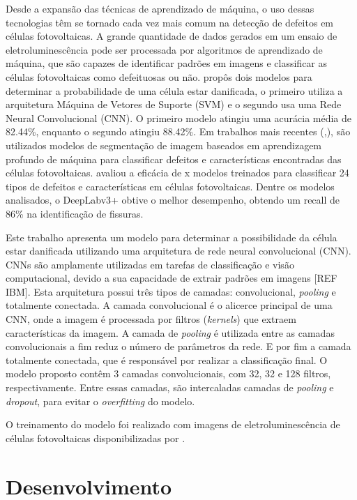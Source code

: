 \documentclass[conference]{IEEEtran}
\begin{document}
Desde a expansão das técnicas de aprendizado de máquina, o uso dessas
tecnologias têm se tornado cada vez mais comum na detecção de defeitos em
células fotovoltaicas. A grande quantidade de dados gerados em um ensaio de
eletroluminescência pode ser processada por algoritmos de aprendizado de
máquina, que são capazes de identificar padrões em imagens e classificar as
células fotovoltaicas como defeituosas ou não. \cite{Pratt2023} propôs
dois modelos
para determinar a probabilidade de uma célula estar danificada, o primeiro
utiliza a arquitetura
Máquina de Vetores de Suporte (SVM) e o segundo usa uma Rede Neural
Convolucional (CNN). O primeiro modelo atingiu uma acurácia média de 82.44\%,
enquanto o segundo atingiu 88.42\%. Em trabalhos mais recentes
(\cite{Pratt2023},\cite{Pratt2021}), são
utilizados modelos de segmentação de imagem baseados em aprendizagem profundo
de máquina para classificar defeitos e características encontradas das células
fotovoltaicas.\cite{Pratt2023} avaliou a eficácia de x modelos treinados para
classificar
24 tipos de defeitos e características em células fotovoltaicas.
Dentre os modelos analisados, o DeepLabv3+ obtive o melhor
desempenho, obtendo um recall de 86\% na identificação de fissuras.

Este trabalho apresenta um modelo para determinar a
possibilidade da célula estar danificada utilizando uma arquitetura de rede
neural convolucional (CNN). CNNs são amplamente utilizadas em tarefas de
classificação e visão computacional, devido a sua capacidade de extrair padrões
em imagens [REF IBM]. Esta arquitetura possui três tipos de camadas:
convolucional, \textit{pooling} e totalmente conectada. A camada convolucional
é o alicerce principal de uma CNN, onde a imagem é processada por filtros
(\textit{kernels}) que
extraem características da imagem. A camada de \textit{pooling} é utilizada
entre as camadas convolucionais a fim reduz o número de parâmetros da rede. E
por fim a camada totalmente conectada, que é responsável por realizar a
classificação final. O modelo proposto contêm 3 camadas convolucionais, com 32,
32 e 128 filtros, respectivamente. Entre essas camadas, são intercaladas
camadas de
\textit{pooling} e \textit{dropout}, para evitar o \textit{overfitting} do
modelo.

O treinamento do modelo foi realizado com imagens de
eletroluminescência de células fotovoltaicas disponibilizadas por
\cite{Deitsch2021}.

\section{Desenvolvimento}
\end{document}
